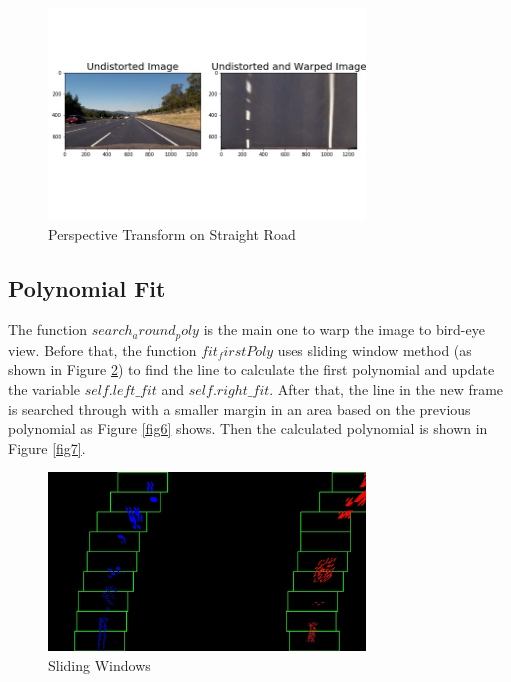\documentclass{article}
\begin{document}
\begin{figure}[h!t]
\begin{center}
\includegraphics[width=0.75\textwidth]{../output_images/birdeye/straight_lines2.jpg}
\caption{Perspective Transform on Straight Road}
\label{fig4}
\end{center}
\end{figure}

\subsection{Polynomial Fit} 
The function $search_around_poly$ is the main one to warp the image to bird-eye view. Before that, the function $fit_firstPoly$ uses sliding window method (as shown in Figure \ref{fig5}) to find the line to calculate the first polynomial and update the variable $self.left\_fit$ and $self.right\_fit$.  After that, the line in the new frame is searched through with a smaller margin in an area based on the previous polynomial as  Figure \ref{fig6} shows. Then the calculated polynomial is shown in Figure \ref{fig7}.

\begin{figure}[h!t]
\begin{center}
\includegraphics[width=0.75\textwidth]{../output_images/polynomialfit/test5.jpg}
\caption{Sliding Windows}
\label{fig5}
\end{center}
\end{figure}
\end{document}

